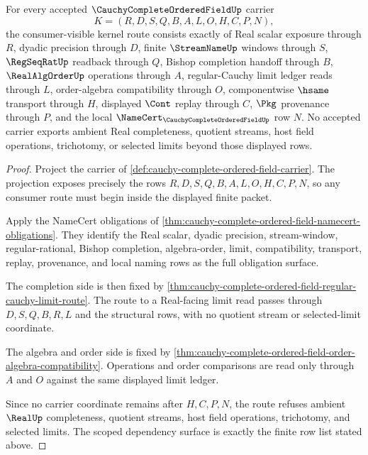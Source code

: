 \begin{theorem}
\label{thm:cauchy-complete-ordered-field-scoped-kernel-route}
For every accepted $\CauchyCompleteOrderedFieldUp$ carrier
$$
K=(R,D,S,Q,B,A,L,O,H,C,P,N),
$$
the consumer-visible kernel route consists exactly of Real scalar exposure through $R$, dyadic precision through $D$, finite $\StreamNameUp$ windows through $S$, $\RegSeqRatUp$ readback through $Q$, Bishop completion handoff through $B$, $\RealAlgOrderUp$ operations through $A$, regular-Cauchy limit ledger reads through $L$, order-algebra compatibility through $O$, componentwise $\hsame$ transport through $H$, displayed $\Cont$ replay through $C$, $\Pkg$ provenance through $P$, and the local $\NameCert_{\CauchyCompleteOrderedFieldUp}$ row $N$. No accepted carrier exports ambient Real completeness, quotient streams, host field operations, trichotomy, or selected limits beyond those displayed rows.
\end{theorem}
\begin{proof}
Project the carrier of \autoref{def:cauchy-complete-ordered-field-carrier}. The projection exposes precisely the rows $R,D,S,Q,B,A,L,O,H,C,P,N$, so any consumer route must begin inside the displayed finite packet.

Apply the NameCert obligations of \autoref{thm:cauchy-complete-ordered-field-namecert-obligations}. They identify the Real scalar, dyadic precision, stream-window, regular-rational, Bishop completion, algebra-order, limit, compatibility, transport, replay, provenance, and local naming rows as the full obligation surface.

The completion side is then fixed by \autoref{thm:cauchy-complete-ordered-field-regular-cauchy-limit-route}. The route to a Real-facing limit read passes through $D,S,Q,B,R,L$ and the structural rows, with no quotient stream or selected-limit coordinate.

The algebra and order side is fixed by \autoref{thm:cauchy-complete-ordered-field-order-algebra-compatibility}. Operations and order comparisons are read only through $A$ and $O$ against the same displayed limit ledger.

Since no carrier coordinate remains after $H,C,P,N$, the route refuses ambient $\RealUp$ completeness, quotient streams, host field operations, trichotomy, and selected limits. The scoped dependency surface is exactly the finite row list stated above.
\end{proof}


